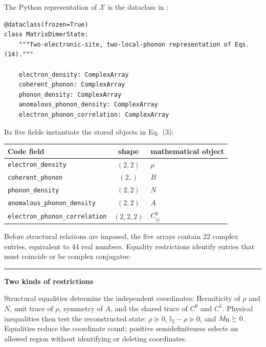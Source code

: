 \documentclass[10pt,letterpaper,twocolumn]{article}
\newcommand{\I}{\mathbb I}
\newcommand{\code}[1]{\texttt{#1}}
\newcommand{\tracebox}[3]{%
  \par\smallskip
  \noindent\begin{minipage}{\columnwidth}
    {\color{#1}\rule{\columnwidth}{1.1pt}}\par\vspace{-1pt}
    \small\textbf{\color{#1}#3}\par\smallskip\color{black}
}
\newcommand{\closetracebox}{%
  \par\vspace{1pt}{\color{navy!35}\rule{\columnwidth}{0.35pt}}
  \end{minipage}\par\smallskip
}
\newcommand{\segmenthead}[1]{%
  \par\medskip{\color{navy}\large\bfseries #1}\par
  \vspace{-2pt}{\color{navy}\rule{\columnwidth}{0.7pt}}\par\smallskip
}
\begin{document}
\segmenthead{Appendix B2. MatrixDimerState}
\label{app:state}

The Python representation of \(\mathcal X\) is the dataclass in
:

\begin{lstlisting}[style=pythontrace,firstnumber=78]
@dataclass(frozen=True)
class MatrixDimerState:
    """Two-electronic-site, two-local-phonon representation of Eqs. (14)."""

    electron_density: ComplexArray
    coherent_phonon: ComplexArray
    phonon_density: ComplexArray
    anomalous_phonon_density: ComplexArray
    electron_phonon_correlation: ComplexArray
\end{lstlisting}

Its five fields instantiate the stored objects in Eq.~(3):

\begin{center}
\small
\begin{tabularx}{\columnwidth}{@{}l c Y@{}}
\toprule
Code field & shape & mathematical object\\
\midrule
\code{electron\_density} & \((2,2)\) & \(\rho\)\\
\code{coherent\_phonon} & \((2,)\) & \(B\)\\
\code{phonon\_density} & \((2,2)\) & \(N\)\\
\code{anomalous\_phonon\_density} & \((2,2)\) & \(A\)\\
\code{electron\_phonon\_correlation} & \((2,2,2)\) & \(C^q_{ij}\)\\
\bottomrule
\end{tabularx}
\end{center}

Before structural relations are imposed, the five arrays contain 22 complex
entries, equivalent to 44 real numbers.  Equality restrictions identify
entries that must coincide or be complex conjugates:

\tracebox{navy}{paleblue}{Two kinds of restrictions}
Structural equalities determine the independent coordinates: Hermiticity of
\(\rho\) and \(N\), unit trace of \(\rho\), symmetry of \(A\), and the shared
trace of \(C^0\) and \(C^1\).  Physical inequalities then test the reconstructed
state: \(\rho\succeq0\), \(\I_2-\rho\succeq0\), and
\(M_{\rm B}\succeq0\).  Equalities reduce the
coordinate count; positive semidefiniteness selects an allowed region without
identifying or deleting coordinates.
\closetracebox
\end{document}
